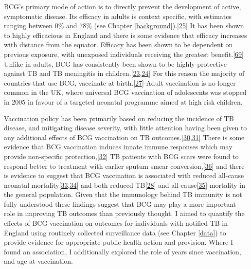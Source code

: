 \documentclass[11pt,twoside]{bristolthesis}
\begin{document}
  BCG's primary mode of action is to directly prevent the development of active, symptomatic disease. Its efficacy in adults is context specific, with estimates ranging between 0\% and 78\% (see Chapter \ref{background}).{[}\protect\hyperlink{ref-Mangtani2014a}{25}{]} It has been shown to highly efficacious in England and there is some evidence that efficacy increases with distance from the equator. Efficacy has been shown to be dependent on previous exposure, with unexposed individuals receiving the greatest benefit.{[}\protect\hyperlink{ref-Barreto2014a}{69}{]} Unlike in adults, BCG has consistently been shown to be highly protective against TB and TB meningitis in children.{[}\protect\hyperlink{ref-Rodrigues1993}{23},\protect\hyperlink{ref-Colditz1994}{24}{]} For this reason the majority of countries that use BCG, vaccinate at birth.{[}\protect\hyperlink{ref-Zwerling2011}{27}{]} Adult vaccination is no longer common in the UK, where universal BCG vaccination of adolescents was stopped in 2005 in favour of a targeted neonatal programme aimed at high risk children.
  
  Vaccination policy has been primarily based on reducing the incidence of TB disease, and mitigating disease severity, with little attention having been given to any additional effects of BCG vaccination on TB outcomes.{[}\protect\hyperlink{ref-Fine2005a}{30},\protect\hyperlink{ref-Teo2006}{31}{]} There is some evidence that BCG vaccination induces innate immune responses which may provide non-specific protection,{[}\protect\hyperlink{ref-Kleinnijenhuis2012}{32}{]} TB patients with BCG scars were found to respond better to treatment with earlier sputum smear conversion,{[}\protect\hyperlink{ref-Jeremiah2010}{36}{]} and there is evidence to suggest that BCG vaccination is associated with reduced all-cause neonatal mortality{[}\protect\hyperlink{ref-Garly2003}{33},\protect\hyperlink{ref-Higgins}{34}{]} and both reduced TB{[}\protect\hyperlink{ref-Abubakar2013}{28}{]} and all-cause{[}\protect\hyperlink{ref-Rieckmann2016}{35}{]} mortality in the general population. Given that the immunology behind TB immunity is not fully understood these findings suggest that BCG may play a more important role in improving TB outcomes than previously thought. I aimed to quantify the effects of BCG vaccination on outcomes for individuals with notified TB in England using routinely collected surveillance data (see Chapter \ref{data}) to provide evidence for appropriate public health action and provision. Where I found an association, I additionally explored the role of years since vaccination, and age at vaccination.
  
\end{document}
